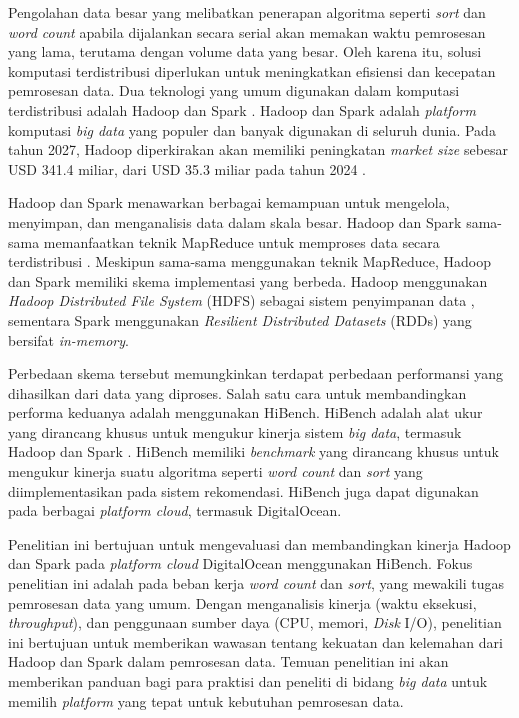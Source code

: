 Pengolahan data besar yang melibatkan penerapan algoritma seperti \textit{sort} dan \textit{word count} apabila dijalankan secara serial akan memakan waktu pemrosesan yang lama, terutama dengan volume data yang besar. Oleh karena itu, solusi komputasi terdistribusi diperlukan untuk meningkatkan efisiensi dan kecepatan pemrosesan data. Dua teknologi yang umum digunakan dalam komputasi terdistribusi adalah Hadoop dan Spark \cite{saputroPerbandinganKinerjaKomputasi2020}. Hadoop dan Spark adalah \textit{platform} komputasi \textit{big data} yang populer dan banyak digunakan di seluruh dunia. Pada tahun 2027, Hadoop diperkirakan akan memiliki peningkatan \textit{market size} sebesar USD 341.4 miliar, dari USD 35.3 miliar pada tahun 2024 \cite{HadoopMarketSize}.

Hadoop dan Spark menawarkan berbagai kemampuan untuk mengelola, menyimpan, dan menganalisis data dalam skala besar. Hadoop dan Spark sama-sama memanfaatkan teknik MapReduce untuk memproses data secara terdistribusi \cite{deanMapReduceSimplifiedData2004}.  Meskipun sama-sama menggunakan teknik MapReduce, Hadoop dan Spark memiliki skema implementasi yang berbeda. Hadoop menggunakan \textit{Hadoop Distributed File System} (HDFS) sebagai sistem penyimpanan data \cite{samadiComparativeStudyHadoop2016}, sementara Spark menggunakan \textit{Resilient Distributed Datasets} (RDDs) yang bersifat \textit{in-memory}\cite{ahmadvandGapproxUsingGallup2019}.

Perbedaan skema tersebut memungkinkan terdapat perbedaan performansi yang dihasilkan dari data yang diproses. Salah satu cara untuk membandingkan performa keduanya adalah menggunakan HiBench. HiBench adalah alat ukur yang dirancang khusus untuk mengukur kinerja sistem \textit{big data}, termasuk Hadoop dan Spark \cite{huangHiBenchBenchmarkSuitea}. HiBench memiliki \textit{benchmark} yang dirancang khusus untuk mengukur kinerja suatu algoritma seperti \textit{word count} dan \textit{sort} yang diimplementasikan pada sistem rekomendasi. HiBench juga dapat digunakan pada berbagai \textit{platform cloud}, termasuk DigitalOcean.

Penelitian ini bertujuan untuk mengevaluasi dan membandingkan kinerja Hadoop dan Spark pada \textit{platform cloud} DigitalOcean menggunakan HiBench. Fokus penelitian ini adalah pada beban kerja \textit{word count} dan \textit{sort}, yang mewakili tugas pemrosesan data yang umum. Dengan menganalisis kinerja (waktu eksekusi, \textit{throughput}), dan penggunaan sumber daya (CPU, memori, \textit{Disk} I/O), penelitian ini bertujuan untuk memberikan wawasan tentang kekuatan dan kelemahan dari Hadoop dan Spark dalam pemrosesan data. Temuan penelitian ini akan memberikan panduan bagi para praktisi dan peneliti di bidang \textit{big data} untuk memilih \textit{platform} yang tepat untuk kebutuhan pemrosesan data.

